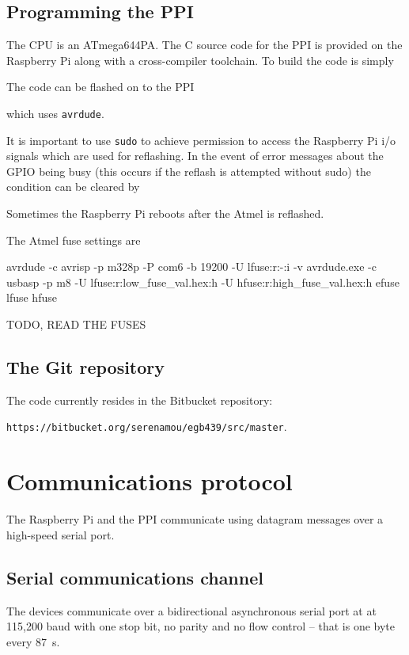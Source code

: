 \documentclass[11pt,fleqn]{article}
\begin{document}
\subsection{Programming the PPI}
The CPU is an ATmega644PA.
The C source code for the PPI is provided on the Raspberry Pi along with a cross-compiler toolchain.  To build the code is simply
\begin{Code}
\end{Code}

The code can be flashed on to the PPI 
\begin{Code}
\end{Code}
which uses \texttt{avrdude}.

It is important to use \texttt{sudo} to achieve permission to access the Raspberry Pi i/o signals which are used for reflashing.
In the event of error messages about the GPIO being busy (this occurs if the reflash is attempted without sudo) the condition can be cleared by
\begin{Code}
\end{Code}

Sometimes the Raspberry Pi reboots after the Atmel is reflashed.

The Atmel fuse settings are

\begin{Code}
avrdude -c avrisp -p m328p -P com6 -b 19200 -U lfuse:r:-:i -v
avrdude.exe -c usbasp -p m8 -U lfuse:r:low_fuse_val.hex:h -U hfuse:r:high_fuse_val.hex:h
efuse
lfuse
hfuse
\end{Code}
TODO, READ THE FUSES

\subsection{The Git repository}
The code currently resides in the Bitbucket repository:

\texttt{https://bitbucket.org/serenamou/egb439/src/master}.


\section{Communications protocol}\label{sec:comms}
The Raspberry Pi and the PPI communicate using datagram messages over a high-speed serial port.

\subsection{Serial communications channel}
The devices communicate over a bidirectional asynchronous serial port at  at 115,200 baud with one stop bit, no parity and no flow
control -- that is  one byte every 87\unit{\mu s}.
\end{document}
